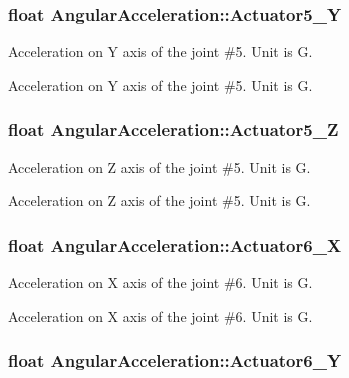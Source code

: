 \subsubsection[{\texorpdfstring{Actuator5\+\_\+Y}{Actuator5_Y}}]{\setlength{\rightskip}{0pt plus 5cm}float Angular\+Acceleration\+::\+Actuator5\+\_\+Y}\hypertarget{structAngularAcceleration_a44a285d25040047b089f3d977a82546a}{}\label{structAngularAcceleration_a44a285d25040047b089f3d977a82546a}


Acceleration on Y axis of the joint \#5. Unit is G. 

Acceleration on Y axis of the joint \#5. Unit is G. 
\subsubsection[{\texorpdfstring{Actuator5\+\_\+Z}{Actuator5_Z}}]{\setlength{\rightskip}{0pt plus 5cm}float Angular\+Acceleration\+::\+Actuator5\+\_\+Z}\hypertarget{structAngularAcceleration_a9ba585569c14f9dec730713ad92cd25d}{}\label{structAngularAcceleration_a9ba585569c14f9dec730713ad92cd25d}


Acceleration on Z axis of the joint \#5. Unit is G. 

Acceleration on Z axis of the joint \#5. Unit is G. 
\subsubsection[{\texorpdfstring{Actuator6\+\_\+X}{Actuator6_X}}]{\setlength{\rightskip}{0pt plus 5cm}float Angular\+Acceleration\+::\+Actuator6\+\_\+X}\hypertarget{structAngularAcceleration_a285c6634d7542d3feaffcc6cc610db05}{}\label{structAngularAcceleration_a285c6634d7542d3feaffcc6cc610db05}


Acceleration on X axis of the joint \#6. Unit is G. 

Acceleration on X axis of the joint \#6. Unit is G. 
\subsubsection[{\texorpdfstring{Actuator6\+\_\+Y}{Actuator6_Y}}]{\setlength{\rightskip}{0pt plus 5cm}float Angular\+Acceleration\+::\+Actuator6\+\_\+Y}\hypertarget{structAngularAcceleration_a1f227cd43faadf267dde95ec75392311}{}\label{structAngularAcceleration_a1f227cd43faadf267dde95ec75392311}


